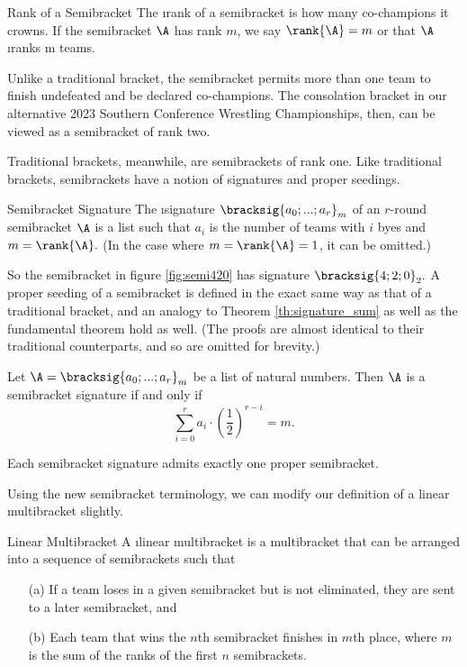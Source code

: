 {    \begin{definition}{Rank of a Semibracket}{}
        The \i{rank} of a semibracket is how many co-champions it crowns. If the semibracket $\A$ has rank $m$, we say $\rank{\A} = m$ or that $\A$ \i{ranks m teams}.
    \end{definition}

    Unlike a traditional bracket, the semibracket permits more than one team to finish undefeated and be declared co-champions. The consolation bracket in our alternative 2023 Southern Conference Wrestling Championships, then, can be viewed as a semibracket of rank two.


    Traditional brackets, meanwhile, are semibrackets of rank one. Like traditional brackets, semibrackets have a notion of signatures and proper seedings.

    \begin{definition}{Semibracket Signature}{}
        The \i{signature} $\bracksig{a_0; ...; a_r}_m$ of an $r$-round semibracket $\A$ is a list such that $a_i$ is the number of teams with $i$ byes and $m = \rank{\A}.$ (In the case where $m = \rank{\A} = 1$, it can be omitted.)
    \end{definition}

    So the semibracket in figure \ref{fig:semi420} has signature $\bracksig{4;2;0}_2.$ A proper seeding of a semibracket is defined in the exact same way as that of a traditional bracket, and an analogy to Theorem \ref{th:signature_sum} as well as the fundamental theorem hold as well. (The proofs are almost identical to their traditional counterparts, and so are omitted for brevity.)

    \begin{theorem}{}{}
        Let $\A = \bracksig{a_0; ...; a_r}_m$ be a list of natural numbers. Then $\A$ is a semibracket signature if and only if $$\sum_{i=0}^r a_i \cdot \left(\frac{1}{2}\right)^{r - i} = m.$$
    \end{theorem}

    \begin{theorem}{}{}
        Each semibracket signature admits exactly one proper semibracket.
    \end{theorem}

    Using the new semibracket terminology, we can modify our definition of a linear multibracket slightly.
    
    \begin{definition}{Linear Multibracket}{}
        A \i{linear multibracket} is a multibracket that can be arranged into a sequence of semibrackets such that
        \begin{enumerate}
            \item[(a)] If a team loses in a given semibracket but is not eliminated, they are sent to a later semibracket, and
            \item[(b)] Each team that wins the $n$th semibracket finishes in $m$th place, where $m$ is the sum of the ranks of the first $n$ semibrackets.
        \end{enumerate}
    \end{definition}

}
